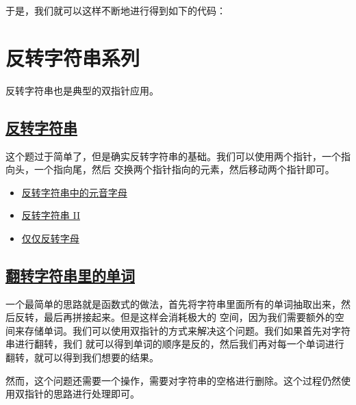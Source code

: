 \documentclass[../../main.tex]{subfiles}
\begin{document}
于是，我们就可以这样不断地进行得到如下的代码：



\section{反转字符串系列}

反转字符串也是典型的双指针应用。

\subsection{\href{https://leetcode.cn/problems/reverse-string/}{反转字符串}}

这个题过于简单了，但是确实反转字符串的基础。我们可以使用两个指针，一个指向头，一个指向尾，然后
交换两个指针指向的元素，然后移动两个指针即可。



\begin{kaobox}[title=类似题目]
  \begin{itemize}
    \item \href{https://leetcode.cn/problems/reverse-vowels-of-a-string/}{反转字符串中的元音字母}
    \item \href{https://leetcode.cn/problems/reverse-string-ii/}{反转字符串 II}
    \item \href{https://leetcode.cn/problems/reverse-only-letters/}{仅仅反转字母}
  \end{itemize}
\end{kaobox}

\subsection{\href{https://leetcode-cn.com/problems/reverse-words-in-a-string/}{翻转字符串里的单词}}

一个最简单的思路就是函数式的做法，首先将字符串里面所有的单词抽取出来，然后反转，最后再拼接起来。但是这样会消耗极大的
空间，因为我们需要额外的空间来存储单词。我们可以使用双指针的方式来解决这个问题。我们如果首先对字符串进行翻转，我们
就可以得到单词的顺序是反的，然后我们再对每一个单词进行翻转，就可以得到我们想要的结果。

然而，这个问题还需要一个操作，需要对字符串的空格进行删除。这个过程仍然使用双指针的思路进行处理即可。


\end{document}

